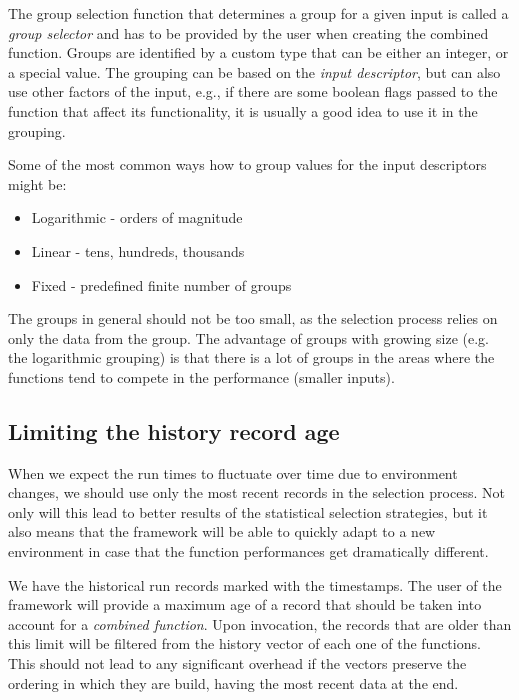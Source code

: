 The group selection function that determines a group for a given input is called a \textit{group selector} and has to be provided by the user when creating the combined function. Groups are identified by a custom type that can be either an integer, or a special  value. The grouping can be based on the \textit{input descriptor}, but can also use other factors of the input, e.g., if there are some boolean flags passed to the function that affect its functionality, it is usually a good idea to use it in the grouping.


Some of the most common ways how to group values for the input descriptors might be:
\begin{itemize}
	\item Logarithmic - orders of magnitude
	\item Linear - tens, hundreds, thousands
	\item Fixed - predefined finite number of groups
\end{itemize}

The groups in general should not be too small, as the selection process relies on only the data from the group. The advantage of groups with growing size (e.g. the logarithmic grouping) is that there is a lot of groups in the areas where the functions tend to compete in the performance (smaller inputs).

\subsection{Limiting the history record age}
\label{subsec:limiting_record_age}

When we expect the run times to fluctuate over time due to environment changes, we should use only the most recent records in the selection process. Not only will this lead to better results of the statistical selection strategies, but it also means that the framework will be able to quickly adapt to a new environment in case that the function performances get dramatically different.

We have the historical run records marked with the timestamps. The user of the framework will provide a maximum age of a record that should be taken into account for a \textit{combined function}. Upon invocation, the records that are older than this limit will be filtered from the history vector of each one of the functions. This should not lead to any significant overhead if the vectors preserve the ordering in which they are build, having the most recent data at the end.

